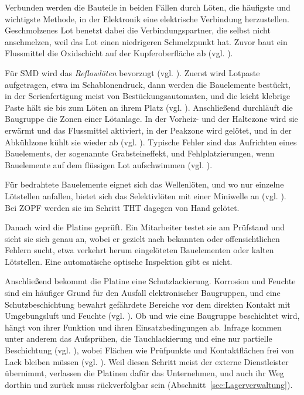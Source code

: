 Verbunden werden die Bauteile in beiden Fällen durch Löten, die häufigste und
wichtigste Methode, in der Elektronik eine elektrische Verbindung herzustellen.
Geschmolzenes Lot benetzt dabei die Verbindungspartner, die selbst nicht
anschmelzen, weil das Lot einen niedrigeren Schmelzpunkt hat. Zuvor baut ein
Flussmittel die Oxidschicht auf der Kupferoberfläche ab (vgl.
\cite[S.~159\,f.]{zickertLeiterplatten2023}).

Für SMD wird das \emph{Reflowlöten} bevorzugt (vgl.
\cite[S.~169]{zickertLeiterplatten2023}). Zuerst wird Lotpaste aufgetragen,
etwa im Schablonendruck, dann werden die Bauelemente bestückt, in der
Serienfertigung meist von Bestückungsautomaten, und die leicht klebrige Paste
hält sie bis zum Löten an ihrem Platz (vgl.
\cite[S.~156, 170]{zickertLeiterplatten2023}). Anschließend durchläuft die
Baugruppe die Zonen einer Lötanlage. In der Vorheiz- und der Haltezone wird sie
erwärmt und das Flussmittel aktiviert, in der Peakzone wird gelötet, und in der
Abkühlzone kühlt sie wieder ab (vgl. \cite[S.~171]{zickertLeiterplatten2023}).
Typische Fehler sind das Aufrichten eines Bauelements, der sogenannte
Grabsteineffekt, und Fehlplatzierungen, wenn Bauelemente auf dem flüssigen Lot
aufschwimmen (vgl. \cite[S.~172\,f.]{zickertLeiterplatten2023}).

Für bedrahtete Bauelemente eignet sich das Wellenlöten, und wo nur einzelne
Lötstellen anfallen, bietet sich das Selektivlöten mit einer Miniwelle an (vgl.
\cite[S.~167, 183]{zickertLeiterplatten2023}). Bei ZOPF werden sie im Schritt
THT dagegen von Hand gelötet.

Danach wird die Platine geprüft. Ein Mitarbeiter testet sie am Prüfstand und
sieht sie sich genau an, wobei er gezielt nach bekannten oder offensichtlichen
Fehlern sucht, etwa verkehrt herum eingelöteten Bauelementen oder kalten
Lötstellen. Eine automatische optische Inspektion gibt es nicht.

Anschließend bekommt die Platine eine Schutzlackierung. Korrosion und Feuchte
sind ein häufiger Grund für den Ausfall elektronischer Baugruppen, und eine
Schutzbeschichtung bewahrt gefährdete Bereiche vor dem direkten Kontakt mit
Umgebungsluft und Feuchte (vgl.
\cite[S.~45, 47]{suppaAnforderungenSchutzlackierung2013}). Ob und wie eine
Baugruppe beschichtet wird, hängt von ihrer Funktion und ihren
Einsatzbedingungen ab. Infrage kommen unter anderem das Aufsprühen, die
Tauchlackierung und eine nur partielle Beschichtung (vgl.
\cite[S.~44]{suppaAnforderungenSchutzlackierung2013}), wobei Flächen wie
Prüfpunkte und Kontaktflächen frei von Lack bleiben müssen (vgl.
\cite[S.~46]{suppaAnforderungenSchutzlackierung2013}). Weil diesen Schritt
meist der externe Dienstleister übernimmt, verlassen die Platinen dafür das
Unternehmen, und auch ihr Weg dorthin und zurück muss rückverfolgbar sein
(Abschnitt~\ref{sec:Lagerverwaltung}).

